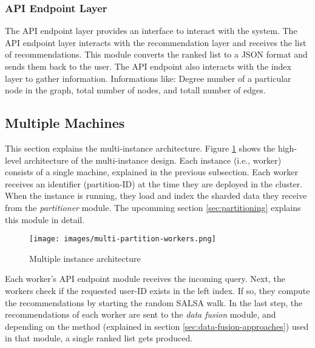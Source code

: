 \subsubsection{API Endpoint Layer}
\label{subsubsec:api-endpoint-layer}
The API endpoint layer provides an interface to interact with the system. The API endpoint layer interacts with the recommendation layer and receives the list of recommendations. This module converts the ranked list to a JSON format and sends them back to the user.
The API endpoint also interacts with the index layer to gather information. Informations like: Degree number of a particular node in the graph, total number of nodes, and totall number of edges.

\subsection{Multiple Machines}
\label{subsec:multiple-machines}
This section explains the multi-instance architecture. Figure \ref{fig:multiple-machine-architecture} shows the high-level architecture of the multi-instance design. Each instance (i.e., worker) consists of a single machine, explained in the previous subsection. Each worker receives an identifier (partition-ID) at the time they are deployed in the cluster. When the instance is running, they load and index the sharded data they receive from the \emph{partitioner} module. The upcomming section \ref{sec:partitioning} explains this module in detail. 



\begin{figure}[!h]
	\centering
	\texttt{[image: images/multi-partition-workers.png]}
	\caption{Multiple instance architecture}
	\label{fig:multiple-machine-architecture}
\end{figure}


Each worker's API endpoint module receives the incoming query. Next, the workers check if the requested user-ID exists in the left index. If so, they compute the recommendations by starting the random SALSA walk. In the last step, the recommendations of each worker are sent to the \emph{data fusion} module, and depending on the method (explained in section \ref{sec:data-fusion-approaches}) used in that module, a single ranked list gets produced.

